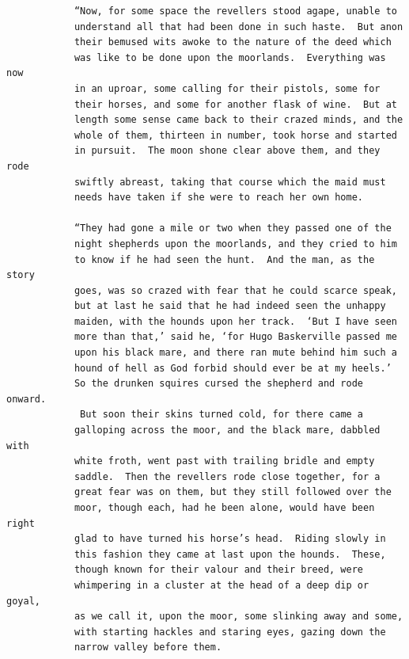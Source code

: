 \documentclass{article}
\begin{document}
\begin{verbatim}
            “Now, for some space the revellers stood agape, unable to
            understand all that had been done in such haste.  But anon
            their bemused wits awoke to the nature of the deed which
            was like to be done upon the moorlands.  Everything was now
            in an uproar, some calling for their pistols, some for
            their horses, and some for another flask of wine.  But at
            length some sense came back to their crazed minds, and the
            whole of them, thirteen in number, took horse and started
            in pursuit.  The moon shone clear above them, and they rode
            swiftly abreast, taking that course which the maid must
            needs have taken if she were to reach her own home.

            “They had gone a mile or two when they passed one of the
            night shepherds upon the moorlands, and they cried to him
            to know if he had seen the hunt.  And the man, as the story
            goes, was so crazed with fear that he could scarce speak,
            but at last he said that he had indeed seen the unhappy
            maiden, with the hounds upon her track.  ‘But I have seen
            more than that,’ said he, ‘for Hugo Baskerville passed me
            upon his black mare, and there ran mute behind him such a
            hound of hell as God forbid should ever be at my heels.’
            So the drunken squires cursed the shepherd and rode onward.
             But soon their skins turned cold, for there came a
            galloping across the moor, and the black mare, dabbled with
            white froth, went past with trailing bridle and empty
            saddle.  Then the revellers rode close together, for a
            great fear was on them, but they still followed over the
            moor, though each, had he been alone, would have been right
            glad to have turned his horse’s head.  Riding slowly in
            this fashion they came at last upon the hounds.  These,
            though known for their valour and their breed, were
            whimpering in a cluster at the head of a deep dip or goyal,
            as we call it, upon the moor, some slinking away and some,
            with starting hackles and staring eyes, gazing down the
            narrow valley before them.


\end{verbatim}
\end{document}
